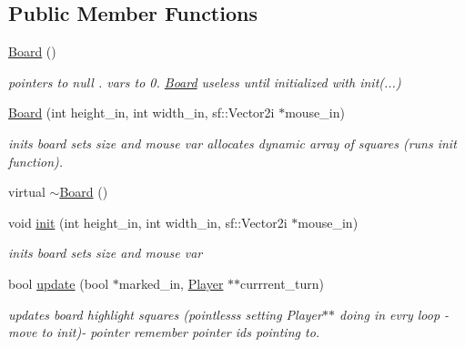 \subsection*{Public Member Functions}
\begin{DoxyCompactItemize}
\item 
\hyperlink{class_board_a9ee491d4fea680cf69b033374a9fdfcb}{Board} ()
\begin{DoxyCompactList}\small\item\em pointers to null . vars to 0. \hyperlink{class_board}{Board} useless until initialized with init(...) \end{DoxyCompactList}\item 
\hyperlink{class_board_af98d75fee5ec0d1fc87a41a64a2dea91}{Board} (int height\+\_\+in, int width\+\_\+in, sf\+::\+Vector2i $\ast$mouse\+\_\+in)
\begin{DoxyCompactList}\small\item\em inits board sets size and mouse var allocates dynamic array of squares (runs init function). \end{DoxyCompactList}\item 
virtual \hyperlink{class_board_af73f45730119a1fd8f6670f53f959e68}{$\sim$\+Board} ()
\item 
void \hyperlink{class_board_a7bb620341249cac1e5366e4fe0c91135}{init} (int height\+\_\+in, int width\+\_\+in, sf\+::\+Vector2i $\ast$mouse\+\_\+in)
\begin{DoxyCompactList}\small\item\em inits board sets size and mouse var \end{DoxyCompactList}\item 
bool \hyperlink{class_board_a05f30f65527fdbfe4950040f2e44da6f}{update} (bool $\ast$marked\+\_\+in, \hyperlink{class_player}{Player} $\ast$$\ast$currrent\+\_\+turn)
\begin{DoxyCompactList}\small\item\em updates board highlight squares (pointlesss setting Player$\ast$$\ast$ doing in evry loop -\/ move to init)-\/ pointer remember pointer ids pointing to. \end{DoxyCompactList}\end{DoxyCompactItemize}
